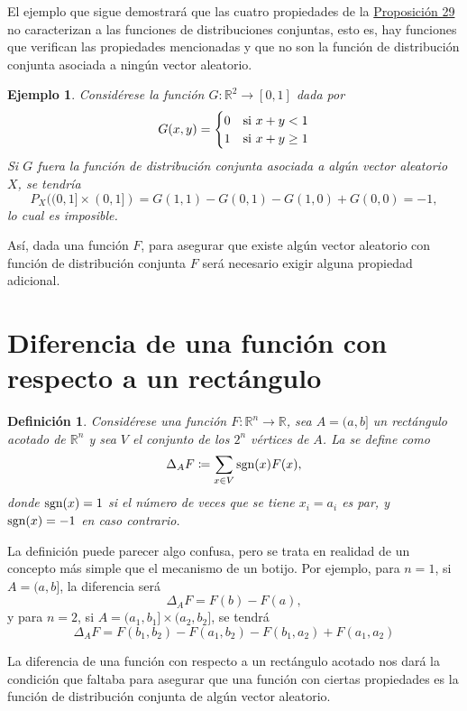 \documentclass[11pt]{report}
\theoremstyle{mytheorem}
\theoremstyle{mydefinition}
\newtheorem{definition}{Definición}
\theoremstyle{myexample}
\newtheorem*{example}{Ejemplo}
\newenvironment{cdefinition} %
  {\begin{mdframed}[
        linewidth=3pt,
        linecolor=c1,
        bottomline=false,
        topline=false,
        rightline=false,
        innerrightmargin=0pt,
        innertopmargin=0pt,
        innerbottommargin=0pt,
        innerleftmargin=1em,
        skipabove=\baselineskip]
    \begin{definition}}
  {\end{definition}\end{mdframed}}
\newcommand{\R}{\mathbb R}
\newcommand{\mybf}[1]{\boldmath\textbf{\color{c1}#1}\unboldmath} %
\begin{document}
El ejemplo que sigue demostrará que las cuatro propiedades de la \hyperref[prop7.2.]{\color{gray}Proposición 29} no caracterizan a las funciones de distribuciones conjuntas, esto es, hay funciones que verifican las propiedades mencionadas y que no son la función de distribución conjunta asociada a ningún vector aleatorio.

\begin{example}
Considérese la función $G \colon \R^2 \to [0,1]$ dada por
\[G(x,y) = \begin{cases}
    0 & $si$ \ x+y< 1 \\
    1 & $si$ \ x+y \geq 1
\end{cases}\]
Si $G$ fuera la función de distribución conjunta asociada a algún vector aleatorio $X$, se tendría
\[P_X((0,1] \times (0,1]) = G(1,1)-G(0,1)-G(1,0)+G(0,0) = -1,\]
lo cual es imposible.
\end{example}

Así, dada una función $F$, para asegurar que existe algún vector aleatorio con función de distribución conjunta $F$ será necesario exigir alguna propiedad adicional.

\section{Diferencia de una función con respecto a un rectángulo}

\begin{cdefinition}
Considérese una función $F \colon \R^n \to \R$, sea $A = (a,b]$ un rectángulo acotado de $\R^n$ y sea $V$ el conjunto de los $2^n$ vértices de $A$. La \mybf{{diferencia de $\bm{F}$ con respecto a $\bm{A}$}} se define como
\[\Delta_AF \coloneqq \sum_{x \in V} \textup{sgn}(x)F(x),\]
donde $\textup{sgn}(x) = 1$ si el número de veces que se tiene $x_i=a_i$ es par, y $\textup{sgn}(x) = -1$ en caso contrario.
\end{cdefinition}

La definición puede parecer algo confusa, pero se trata en realidad de un concepto más simple que el mecanismo de un botijo. Por ejemplo, para $n = 1$, si $A = (a,b]$, la diferencia será
\[\Delta_AF = F(b)-F(a),\]
y para $n = 2$, si $A = (a_1,b_1] \times (a_2,b_2]$, se tendrá
\[\Delta_AF = F(b_1,b_2)-F(a_1,b_2)-F(b_1,a_2)+F(a_1,a_2)
\]

La diferencia de una función con respecto a un rectángulo acotado nos dará la condición que faltaba para asegurar que una función con ciertas propiedades es la función de distribución conjunta de algún vector aleatorio.
\end{document}
